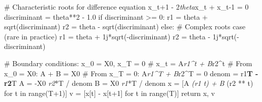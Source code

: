 \documentclass[11pt]{article}
\begin{document}
    \# Characteristic roots for difference equation x\_{t+1} - 2\textit{theta}x\_t + x\_{t-1} = 0
    discriminant = theta**2 - 1.0
    if discriminant >= 0:
        r1 = theta + sqrt(discriminant) 
        r2 = theta - sqrt(discriminant)
    else:
        \# Complex roots case (rare in practice)
        r1 = theta + 1j*sqrt(-discriminant)
        r2 = theta - 1j*sqrt(-discriminant)
    
    \# Boundary conditions: x\_0 = X0, x\_T = 0
    \# x\_t = A\textit{r1^t + B}r2^t
    \# From x\_0 = X0: A + B = X0
    \# From x\_T = 0:  A\textit{r1^T + B}r2^T = 0
    denom = r1\textbf{T - r2}T
    A = -X0 \textit{ r2}*T / denom
    B = X0 \textit{ r1}*T / denom
    x = [A \textit{ (r1 }\textit{ t) + B } (r2 ** t) for t in range(T+1)]
    v = [x[t] - x[t+1] for t in range(T)]
    return x, v
\end{document}
